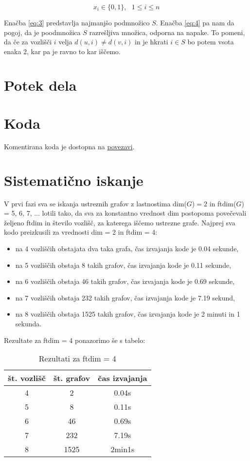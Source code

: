 \documentclass[12pt]{article}
\begin{document}
\begin{equation}
    x_i \in \{0, 1\}, \text{ } 1 \leq i \leq n
\label{eq:5}
\end{equation}

Enačba \eqref{eq:3} predstavlja najmanjšo podmnožico $S.$ Enačba \eqref{eq:4} pa nam da pogoj, da
je poodmnožica $S$ razrešljiva množica, odporna na napake. To pomeni, da če za vozlišči $i$ velja 
$d(u, i) \neq d(v, i)$ in je hkrati $i \in S$ bo potem vsota enaka 2, kar pa je ravno to kar iščemo.

\section{Potek dela}


\section{Koda}
Komentirana koda je dostopna na \href{https://github.com/HanaSamsa/Problem-metricnih-dimenzij-odpornih-na-napake.git}{povezavi}.

\section{Sistematično iskanje}

V prvi fazi sva se iskanja ustreznih grafov z lastnostima dim($G$)$ =2$ in ftdim($G$) = 5, 6, 7, ... lotili tako, da sva za konstantno vrednost dim postopoma povečevali željeno ftdim in število vozlišč, za katerega iščemo ustrezne grafe. Najprej sva kodo preizkusili za vrednosti dim = 2 in ftdim = 4:
\begin{itemize}
    \item na 4 vozliščih obstajata dva taka grafa, čas izvajanja kode je 0.04 sekunde,
    \item na 5 vozliščih obstaja 8 takih grafov, čas izvajanja kode je 0.11 sekunde,
    \item na 6 vozliščih obstaja 46 takih grafov, čas izvajanja kode je 0.69 sekunde,
    \item na 7 vozliščih obstaja 232 takih grafov, čas izvajanja kode je 7.19 sekund,
    \item na 8 vozliščih obstaja 1525 takih grafov, čas izvajanja kode je 2 minuti in 1 sekunda.
\end{itemize}

Rezultate za ftdim = 4 ponazorimo še s tabelo:

\begin{table}[H] 
 \centering 
 \begin{tabular}{|c|c|c|} 
 \hline 
 \textbf{št. vozlišč} & \textbf{št. grafov} & \textbf{čas izvajanja} \\
 \hline 4 & 2 & 0.04s  \\ 
 \hline 5 & 8 & 0.11s \\ 
 \hline 6 & 46 & 0.69s \\ 
 \hline 7 & 232 & 7.19s \\
 \hline 8 & 1525 & 2min1s \\
 \hline 
 \end{tabular} 
 \caption{Rezultati za ftdim = 4}
 \label{tab:osebe}
\end{table}
\end{document}
